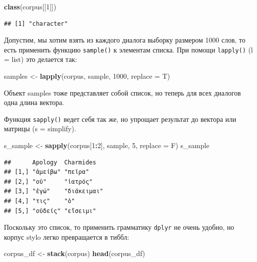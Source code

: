 \documentclass[
]{book}
\newenvironment{Shaded}{\begin{snugshade}}{\end{snugshade}}
\newcommand{\AttributeTok}[1]{\textcolor[rgb]{0.13,0.29,0.53}{#1}}
\newcommand{\DecValTok}[1]{\textcolor[rgb]{0.00,0.00,0.81}{#1}}
\newcommand{\FunctionTok}[1]{\textcolor[rgb]{0.13,0.29,0.53}{\textbf{#1}}}
\newcommand{\NormalTok}[1]{#1}
\newcommand{\OtherTok}[1]{\textcolor[rgb]{0.56,0.35,0.01}{#1}}
\newcommand{\SpecialCharTok}[1]{\textcolor[rgb]{0.81,0.36,0.00}{\textbf{#1}}}
\theoremstyle{definition}
\theoremstyle{definition}
\theoremstyle{definition}
\theoremstyle{definition}
\theoremstyle{remark}
\begin{document}
\begin{Shaded}
\begin{Highlighting}[]
\FunctionTok{class}\NormalTok{(corpus[[}\DecValTok{1}\NormalTok{]])}
\end{Highlighting}
\end{Shaded}

\begin{verbatim}
## [1] "character"
\end{verbatim}

Допустим, мы хотим взять из каждого диалога выборку размером 1000 слов, то есть применить функцию \texttt{sample()} к элементам списка. При помощи \texttt{lapply()} (l = list) это делается так:

\begin{Shaded}
\begin{Highlighting}[]
\NormalTok{samples }\OtherTok{\textless{}{-}} \FunctionTok{lapply}\NormalTok{(corpus, sample, }\DecValTok{1000}\NormalTok{, }\AttributeTok{replace =}\NormalTok{ T)}
\end{Highlighting}
\end{Shaded}

Объект samples тоже представляет собой список, но теперь для всех диалогов одна длина вектора.

Функция \texttt{sapply()} ведет себя так же, но упрощает результат до вектора или матрицы (s = simplify).

\begin{Shaded}
\begin{Highlighting}[]
\NormalTok{s\_sample }\OtherTok{\textless{}{-}} \FunctionTok{sapply}\NormalTok{(corpus[}\DecValTok{1}\SpecialCharTok{:}\DecValTok{2}\NormalTok{], sample, }\DecValTok{5}\NormalTok{, }\AttributeTok{replace =}\NormalTok{ F)}
\NormalTok{s\_sample}
\end{Highlighting}
\end{Shaded}

\begin{verbatim}
##      Apology  Charmides  
## [1,] "ἀμείβω" "πεῖρα"    
## [2,] "οὐ"     "ἰατρός"   
## [3,] "ἐγώ"    "διάκειμαι"
## [4,] "τις"    "ὁ"        
## [5,] "οὐδείς" "εἴσειμι"
\end{verbatim}

Поскольку это список, то применить грамматику \texttt{dplyr} не очень удобно, но корпус stylo легко превращается в тиббл:

\begin{Shaded}
\begin{Highlighting}[]
\NormalTok{corpus\_df }\OtherTok{\textless{}{-}} \FunctionTok{stack}\NormalTok{(corpus)}
\FunctionTok{head}\NormalTok{(corpus\_df)}
\end{Highlighting}
\end{Shaded}
\end{document}
